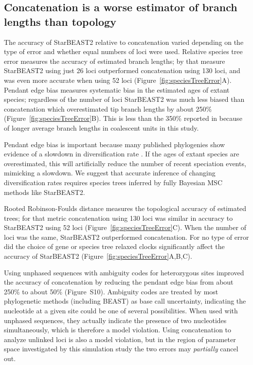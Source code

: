 \documentclass[nogrid]{MBE}%
\begin{document}
\subsection{Concatenation is a worse estimator of branch lengths than topology}

The accuracy of StarBEAST2 relative to concatenation varied depending on
the type of error and whether equal numbers of loci were used. Relative
species tree error measures the accuracy of estimated branch lengths; by that
measure StarBEAST2 using just 26 loci outperformed concatenation using 130
loci, and was even more accurate when using 52 loci
(Figure~\ref{fig:speciesTreeError}A). Pendant edge bias measures systematic
bias in the estimated ages of extant species; regardless of the number of loci
StarBEAST2 was much less biased than concatenation which overestimated tip
branch lengths by about 250\% (Figure~\ref{fig:speciesTreeError}B). This is
less than the 350\% reported in \cite{Ogilvie01052016} because of longer
average branch lengths in coalescent units in this study.

Pendant edge bias is important because many published phylogenies show
evidence of a slowdown in diversification rate \citep{Moen2014190}. If the
ages of extant species are overestimated, this will artificially reduce the
number of recent speciation events, mimicking a slowdown. We suggest that
accurate inference of changing diversification rates requires species trees
inferred by fully Bayesian MSC methods like StarBEAST2.

Rooted Robinson-Foulds distance measures the topological accuracy of estimated
trees; for that metric concatenation using 130 loci was similar in accuracy to
StarBEAST2 using 52 loci (Figure~\ref{fig:speciesTreeError}C). When the number
of loci was the same, StarBEAST2 outperformed concatenation. For no type of
error did the choice of gene or species tree relaxed clocks significantly
affect the accuracy of StarBEAST2 (Figure~\ref{fig:speciesTreeError}A,B,C).

Using unphased sequences with ambiguity codes for heterozygous sites improved
the accuracy of concatenation by reducing the pendant edge bias from about
250\% to about 50\% (Figure~S10). Ambiguity codes are treated by most
phylogenetic methods (including BEAST) as base call uncertainty,
indicating the nucleotide at a given site could be one of several
possibilities. When used with unphased sequences, they actually indicate the
presence of two nucleotides simultaneously, which is therefore a model violation.
Using concatenation to analyze unlinked loci is also a model violation, but in
the region of parameter space investigated by this simulation study the two
errors may \textit{partially} cancel out.
\end{document}
